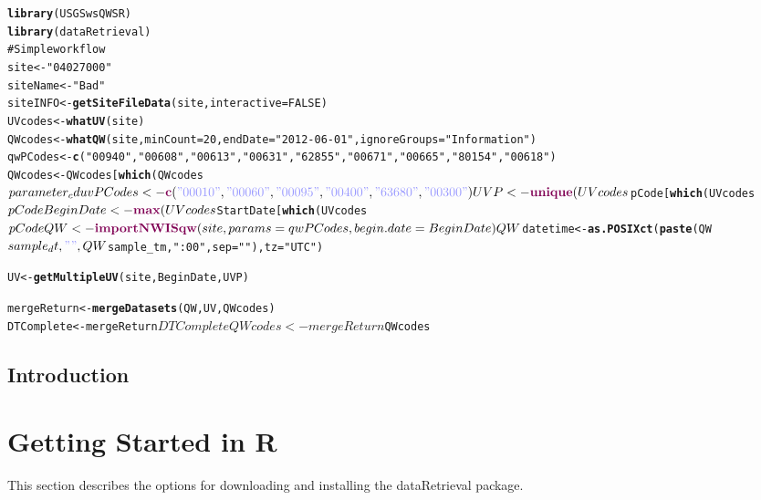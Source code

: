 \documentclass[a4paper,11pt]{article}\usepackage{graphicx, color}
\makeatletter
\newcommand{\hlfunctioncall}[1]{\textcolor[rgb]{0.501960784313725,0,0.329411764705882}{\textbf{#1}}}%
\newcommand{\hlstring}[1]{\textcolor[rgb]{0.6,0.6,1}{#1}}%
\newcommand{\hlcomment}[1]{\textcolor[rgb]{0.180392156862745,0.6,0.341176470588235}{#1}}%
\newenvironment{kframe}{%
 \def\at@end@of@kframe{}%
 \ifinner\ifhmode%
  \def\at@end@of@kframe{\end{minipage}}%
  \begin{minipage}{\columnwidth}%
 \fi\fi%
 \def\FrameCommand##1{\hskip\@totalleftmargin \hskip-\fboxsep
 \colorbox{shadecolor}{##1}\hskip-\fboxsep
     \hskip-\linewidth \hskip-\@totalleftmargin \hskip\columnwidth}%
 \MakeFramed {\advance\hsize-\width
   \@totalleftmargin\z@ \linewidth\hsize
   \@setminipage}}%
 {\par\unskip\endMakeFramed%
 \at@end@of@kframe}
\newenvironment{knitrout}{}{} %
\makeatother
\begin{document}
\begin{knitrout}
\color{fgcolor}\begin{kframe}
\begin{alltt}
\hlfunctioncall{library}(USGSwsQWSR)
\hlfunctioncall{library}(dataRetrieval)
\hlcomment{# Simple workflow}
site <- \hlstring{"04027000"}
siteName <- \hlstring{"Bad"}
siteINFO <-  \hlfunctioncall{getSiteFileData}(site, interactive=FALSE)
UVcodes <- \hlfunctioncall{whatUV}(site)
QWcodes <- \hlfunctioncall{whatQW}(site, minCount=20, endDate=\hlstring{"2012-06-01"},ignoreGroups=\hlstring{"Information"})
qwPCodes <- \hlfunctioncall{c}(\hlstring{"00940"},\hlstring{"00608"},\hlstring{"00613"},\hlstring{"00631"},\hlstring{"62855"},\hlstring{"00671"},\hlstring{"00665"},\hlstring{"80154"},\hlstring{"00618"})
QWcodes <- QWcodes[\hlfunctioncall{which}(QWcodes$parameter_cd %in% qwPCodes),]
uvPCodes <- \hlfunctioncall{c}(\hlstring{"00010"}, \hlstring{"00060"}, \hlstring{"00095"}, \hlstring{"00400"}, \hlstring{"63680"}, \hlstring{"00300"})
UVP <- \hlfunctioncall{unique}(UVcodes$pCode[\hlfunctioncall{which}(UVcodes$pCode %in% uvPCodes)])
BeginDate <- \hlfunctioncall{max}(UVcodes$StartDate[\hlfunctioncall{which}(UVcodes$pCode %in% uvPCodes)])

QW <- \hlfunctioncall{importNWISqw}(site, params=qwPCodes, begin.date=BeginDate)
QW$datetime <- \hlfunctioncall{as.POSIXct}(\hlfunctioncall{paste}(QW$sample_dt,\hlstring{" "},QW$sample_tm, \hlstring{":00"},sep=\hlstring{""}),tz=\hlstring{"UTC"})


UV <- \hlfunctioncall{getMultipleUV}(site, BeginDate, UVP)

mergeReturn <- \hlfunctioncall{mergeDatasets}(QW, UV, QWcodes)
DTComplete <- mergeReturn$DTComplete
QWcodes <- mergeReturn$QWcodes

\end{alltt}
\end{kframe}
\end{knitrout}



\subsection{Introduction}


\clearpage
\appendix

\section{Getting Started in R}
\label{sec:appendix1}
This section describes the options for downloading and installing the dataRetrieval package.
\end{document}
